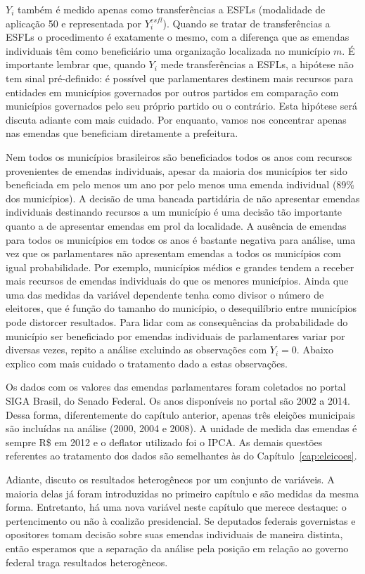 $Y_{i}$ também é medido apenas como transferências a ESFLs (modalidade de aplicação 50 e representada por $Y_{i}^{esfl}$). Quando se tratar de transferências a ESFLs o procedimento é exatamente o mesmo, com a diferença que as emendas individuais têm como beneficiário uma organização localizada no município $m$. É importante lembrar que, quando $Y_{i}$ mede transferências a ESFLs, a hipótese não tem sinal pré-definido: é possível que parlamentares destinem mais recursos para entidades em municípios governados por outros partidos em comparação com municípios governados pelo seu próprio partido ou o contrário. Esta hipótese será discuta adiante com mais cuidado. Por enquanto, vamos nos concentrar apenas nas emendas que beneficiam diretamente a prefeitura.

Nem todos os municípios brasileiros são beneficiados todos os anos com recursos provenientes de emendas individuais, apesar da maioria dos municípios ter sido beneficiada em pelo menos um ano por pelo menos uma emenda individual (89\% dos municípios). A decisão de uma bancada partidária de não apresentar emendas individuais destinando recursos a um município é uma decisão tão importante quanto a de apresentar emendas em prol da localidade. A ausência de emendas para todos os municípios em todos os anos é bastante negativa para análise, uma vez que os parlamentares não apresentam emendas a todos os municípios com igual probabilidade. Por exemplo, municípios médios e grandes tendem a receber mais recursos de emendas individuais do que os menores municípios. Ainda que uma das medidas da variável dependente tenha como divisor o número de eleitores, que é função do tamanho do município, o desequilíbrio entre municípios pode distorcer resultados. Para lidar com as consequências da probabilidade do município ser beneficiado por emendas individuais de parlamentares variar por diversas vezes, repito a análise excluindo as observações com $Y_{i}=0$. Abaixo explico com mais cuidado o tratamento dado a estas observações.

Os dados com os valores das emendas parlamentares foram coletados no portal SIGA Brasil, do Senado Federal. Os anos disponíveis no portal são 2002 a 2014. Dessa forma, diferentemente do capítulo anterior, apenas três eleições municipais são incluídas na análise (2000, 2004 e 2008). A unidade de medida das emendas é sempre R\$ em 2012 e o deflator utilizado foi o IPCA. As demais questões referentes ao tratamento dos dados são semelhantes às do Capítulo~\ref{cap:eleicoes}.

Adiante, discuto os resultados heterogêneos por um conjunto de variáveis. A maioria delas já foram introduzidas no primeiro capítulo e são medidas da mesma forma. Entretanto, há uma nova variável neste capítulo que merece destaque: o pertencimento ou não à coalizão presidencial. Se deputados federais governistas e opositores tomam decisão sobre suas emendas individuais de maneira distinta, então esperamos que a separação da análise pela posição em relação ao governo federal traga resultados heterogêneos.

